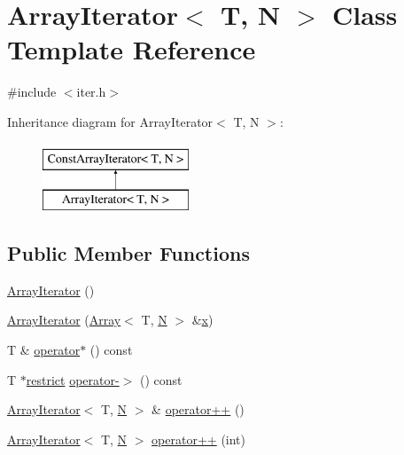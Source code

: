 \hypertarget{classArrayIterator}{}\section{Array\+Iterator$<$ T, N $>$ Class Template Reference}
\label{classArrayIterator}


{\ttfamily \#include $<$iter.\+h$>$}

Inheritance diagram for Array\+Iterator$<$ T, N $>$\+:\begin{figure}[H]
\begin{center}
\leavevmode
\includegraphics[height=2.000000cm]{classArrayIterator}
\end{center}
\end{figure}
\subsection*{Public Member Functions}
\begin{DoxyCompactItemize}
\item 
\hyperlink{classArrayIterator_a0d15f5d545598d869c60278c32b82fe2}{Array\+Iterator} ()
\item 
\hyperlink{classArrayIterator_abbca4823e66b4027c8ff0b024e943f53}{Array\+Iterator} (\hyperlink{classArray}{Array}$<$ T, \hyperlink{polmisc_8c_a0240ac851181b84ac374872dc5434ee4}{N} $>$ \&\hyperlink{vecnorm1_8cc_ac73eed9e41ec09d58f112f06c2d6cb63}{x})
\item 
T \& \hyperlink{classArrayIterator_a371998c7220dd593e413c8bdd2a3f4b9}{operator$\ast$} () const 
\item 
T $\ast$\hyperlink{compiler_8h_a080abdcb9c02438f1cd2bb707af25af8}{restrict} \hyperlink{classArrayIterator_a126157155605f4943f7956167f44bcd5}{operator-\/$>$} () const 
\item 
\hyperlink{classArrayIterator}{Array\+Iterator}$<$ T, \hyperlink{polmisc_8c_a0240ac851181b84ac374872dc5434ee4}{N} $>$ \& \hyperlink{classArrayIterator_a16c12f0cb23ec8cb62d7cd83286a8fa6}{operator++} ()
\item 
\hyperlink{classArrayIterator}{Array\+Iterator}$<$ T, \hyperlink{polmisc_8c_a0240ac851181b84ac374872dc5434ee4}{N} $>$ \hyperlink{classArrayIterator_aa4fb733956562ff91c4db373ebd84111}{operator++} (int)
\end{DoxyCompactItemize}
